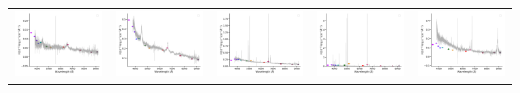 \begin{center}
\begin{longtable}{l l l l l }
    \includegraphics[width=0.2\linewidth, clip]{Figs/Figs-sdss/spec-0288-52000-0171-SPLUS-n01s26-017374.pdf} & \includegraphics[width=0.2\linewidth, clip]{Figs/Figs-sdss/spec-0288-52000-0561-SPLUS-n02n26-016552.pdf} & \includegraphics[width=0.2\linewidth, clip]{Figs/Figs-sdss/spec-0289-51990-0202-SPLUS-n02s28-039352.pdf} & \includegraphics[width=0.2\linewidth, clip]{Figs/Figs-sdss/spec-0289-51990-0210-SPLUS-n02s27-030322.pdf} & \includegraphics[width=0.2\linewidth, clip]{Figs/Figs-sdss/spec-0289-51990-0234-SPLUS-n01s27-014192.pdf} \\

\end{longtable}
\end{center}
